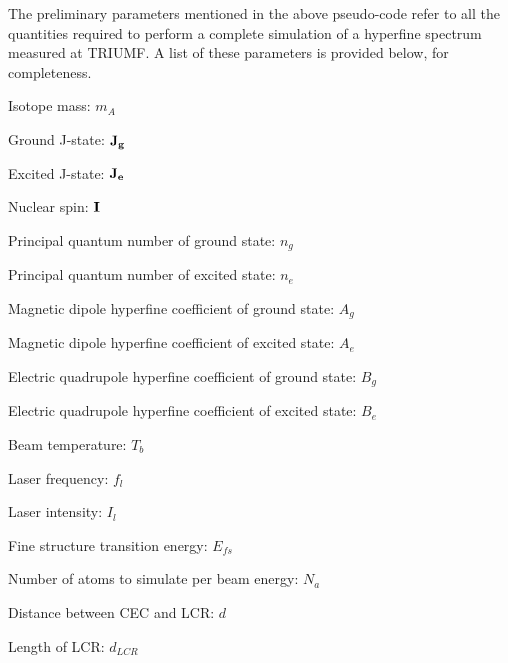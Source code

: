 \vspace{10mm}
The preliminary parameters mentioned in the above pseudo-code refer to all the quantities required to perform a complete simulation of a hyperfine spectrum measured at TRIUMF. A list of these parameters is provided below, for completeness.
\begin{list}{•}{List of Preliminary Parameters and Their Symbols}
\item Isotope mass: $m_A$
\item Ground J-state: $\bf{J}_g$
\item Excited J-state: $\bf{J}_e$
\item Nuclear spin: $\bf{I}$
\item Principal quantum number of ground state: $n_g$
\item Principal quantum number of excited state: $n_e$
\item Magnetic dipole hyperfine coefficient of ground state: $A_g$
\item Magnetic dipole hyperfine coefficient of excited state: $A_e$
\item Electric quadrupole hyperfine coefficient of ground state: $B_g$
\item Electric quadrupole hyperfine coefficient of excited state: $B_e$
\item Beam temperature: $T_b$
\item Laser frequency: $f_l$
\item Laser intensity: $I_l$
\item Fine structure transition energy: $E_{fs}$
\item Number of atoms to simulate per beam energy: $N_a$
\item Distance between CEC and LCR: $d$
\item Length of LCR: $d_{LCR}$
\end{list}